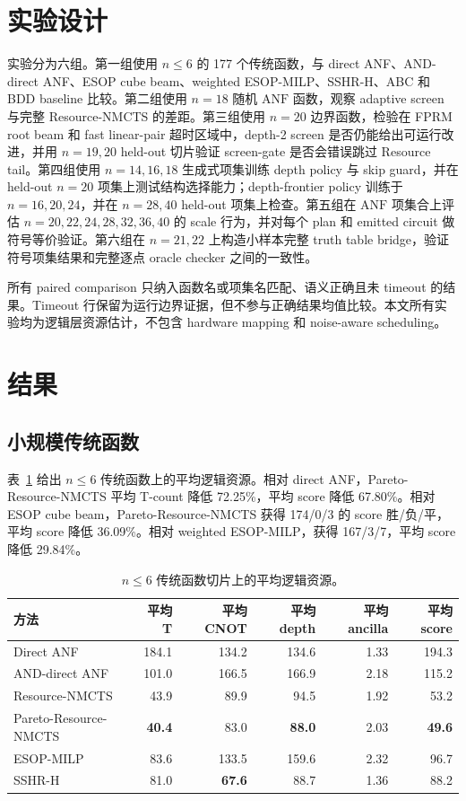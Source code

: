 \documentclass[UTF8,fontset=macnew,11pt]{ctexart}
\newcommand{\method}{Resource-NMCTS}
\newcommand{\anf}{\ensuremath{\mathrm{ANF}}}
\begin{document}
\section{实验设计}

实验分为六组。第一组使用 $n\leq6$ 的 177 个传统函数，与 direct ANF、AND-direct ANF、ESOP cube beam、weighted ESOP-MILP、SSHR-H、ABC 和 BDD baseline 比较。第二组使用 $n=18$ 随机 \anf{} 函数，观察 adaptive screen 与完整 \method{} 的差距。第三组使用 $n=20$ 边界函数，检验在 FPRM root beam 和 fast linear-pair 超时区域中，depth-2 screen 是否仍能给出可运行改进，并用 $n=19,20$ held-out 切片验证 screen-gate 是否会错误跳过 Resource tail。第四组使用 $n=14,16,18$ 生成式项集训练 depth policy 与 skip guard，并在 held-out $n=20$ 项集上测试结构选择能力；depth-frontier policy 训练于 $n=16,20,24$，并在 $n=28,40$ held-out 项集上检查。第五组在 \anf{} 项集合上评估 $n=20,22,24,28,32,36,40$ 的 scale 行为，并对每个 plan 和 emitted circuit 做符号等价验证。第六组在 $n=21,22$ 上构造小样本完整 truth table bridge，验证符号项集结果和完整逐点 oracle checker 之间的一致性。

所有 paired comparison 只纳入函数名或项集名匹配、语义正确且未 timeout 的结果。Timeout 行保留为运行边界证据，但不参与正确结果均值比较。本文所有实验均为逻辑层资源估计，不包含 hardware mapping 和 noise-aware scheduling。

\section{结果}

\subsection{小规模传统函数}

表~\ref{tab:traditional} 给出 $n\leq6$ 传统函数上的平均逻辑资源。相对 direct ANF，Pareto-\method{} 平均 T-count 降低 72.25\%，平均 score 降低 67.80\%。相对 ESOP cube beam，Pareto-\method{} 获得 174/0/3 的 score 胜/负/平，平均 score 降低 36.09\%。相对 weighted ESOP-MILP，获得 167/3/7，平均 score 降低 29.84\%。

\begin{table}[t]
\centering
\small
\caption{$n\leq6$ 传统函数切片上的平均逻辑资源。}
\label{tab:traditional}
\begin{tabular}{lrrrrr}
\toprule
方法 & 平均 T & 平均 CNOT & 平均 depth & 平均 ancilla & 平均 score \\
\midrule
Direct ANF & 184.1 & 134.2 & 134.6 & 1.33 & 194.3 \\
AND-direct ANF & 101.0 & 166.5 & 166.9 & 2.18 & 115.2 \\
\method{} & 43.9 & 89.9 & 94.5 & 1.92 & 53.2 \\
Pareto-\method{} & \textbf{40.4} & 83.0 & \textbf{88.0} & 2.03 & \textbf{49.6} \\
ESOP-MILP & 83.6 & 133.5 & 159.6 & 2.32 & 96.7 \\
SSHR-H & 81.0 & \textbf{67.6} & 88.7 & 1.36 & 88.2 \\
\bottomrule
\end{tabular}
\end{table}
\end{document}
